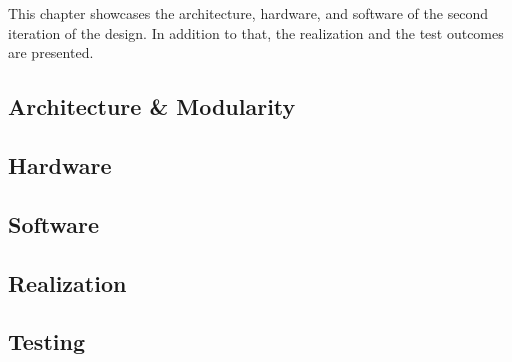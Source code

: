\IEEEPARstart
{T}{his} chapter showcases the architecture, hardware, and software
of the second iteration of the design. In addition to that, the 
realization and the test outcomes are presented.  

\subsection{Architecture \& Modularity}


\subsection{Hardware}


\subsection{Software}


\subsection{Realization}


\subsection{Testing}

